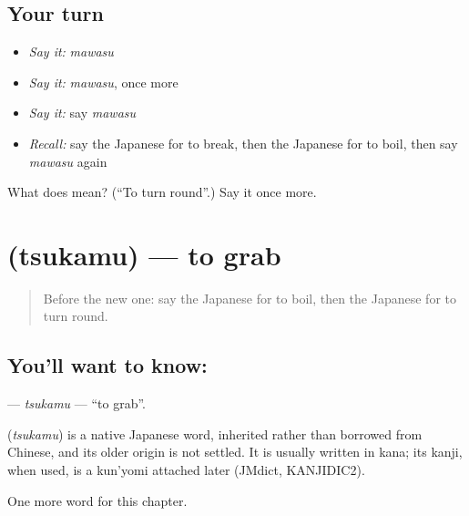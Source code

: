 \subsection*{Your turn}
\begin{itemize}
\raggedright
  \item \emph{Say it:} \emph{mawasu}
  \item \emph{Say it:} \emph{mawasu}, once more
  \item \emph{Say it:} say \emph{mawasu}
  \item \emph{Recall:} say the Japanese for to break, then the Japanese for to boil, then say \emph{mawasu} again
\end{itemize}

\begin{tcolorbox}[breakable,colback=teal!4,colframe=teal!35!black,title={Before you move on}]
What does  mean? (\textquotedblleft{}To turn round\textquotedblright{}.) Say it once more.
\end{tcolorbox}
\section[\texorpdfstring{\ja{つかむ} (tsukamu)}{つかむ (tsukamu)}]{ (tsukamu) — to grab}

\label{lesson:JA-C89-tsukamu}



\begin{quote}
Before the new one: say the Japanese for to boil, then the Japanese for to turn round.
\end{quote}

\subsection*{You'll want to know: }
\textbf{} — \emph{tsukamu} — \textquotedblleft{}to grab\textquotedblright{}.

\begin{cousinweb}
\textbf{} (\emph{tsukamu}) is a native Japanese word, inherited rather than borrowed from Chinese, and its older origin is not settled. It is usually written in kana; its kanji, when used, is a kun'yomi attached later (JMdict, KANJIDIC2).
\end{cousinweb}

\begin{grammarlens}[title={What you've built}]
One more word for this chapter.
\end{grammarlens}

